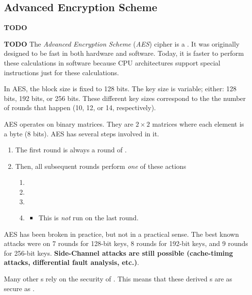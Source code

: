 \subsection{Advanced Encryption Scheme}\label{subsec:AES}
\textbf{TODO}
\begin{definition}\label{def:AES}
  \textbf{TODO}
  The \emph{Advanced Encryption Scheme} (\emph{AES}) cipher is a  .
  It was originally designed to be fast in both hardware and software.
  Today, it is faster to perform these calculations in software because CPU architectures support special instructions just for these calculations.

  In AES, the block size is fixed to 128 bits.
  The key size is variable; either: 128 bits, 192 bits, or 256 bits.
  These different key sizes correspond to the the number of rounds that happen (10, 12, or 14, respectively).

  AES operates on binary matrices.
  They are $2 \times 2$ matrices where each element is a byte (8 bits).
  AES has several steps involved in it.
  \begin{enumerate}[noitemsep]
  \item The first round is always a round of .
  \item Then, all subsequent rounds perform \emph{one} of these actions
    \begin{enumerate}[noitemsep]
    \item {}
    \item {}
    \item {}
    \item {}
      \begin{itemize}[noitemsep]
      \item This is \emph{not} run on the last round.
      \end{itemize}
    \end{enumerate}
  \end{enumerate}

  AES has been broken in practice, but not in a practical sense.
  The best known attacks were on 7 rounds for 128-bit keys, 8 rounds for 192-bit keys, and 9 rounds for 256-bit keys.
  \textbf{Side-Channel attacks are still possible (cache-timing attacks, differential fault analysis, etc.)}.

  \begin{remark}\label{rmk:Other_Crypto_Primitive_Reliance_AES}
    Many other s rely on the security of .
    This means that these derived s are as secure as .
  \end{remark}
\end{definition}

